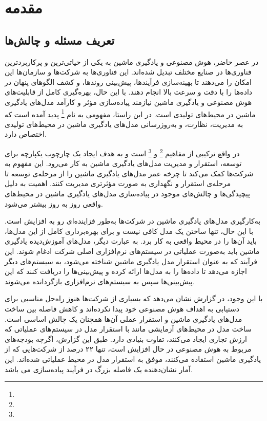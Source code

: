 \chapter{مقدمه} \label{ch:Introduction}

\section{تعریف مسئله و چالش‌ها}
در عصر حاضر، هوش مصنوعی و یادگیری ماشین به یکی از حیاتی‌ترین و پرکاربردترین فناوری‌ها در صنایع مختلف تبدیل شده‌اند. این فناوری‌ها به شرکت‌ها و سازمان‌ها این امکان را می‌دهند تا بهینه‌سازی فرآیندها، پیش‌بینی روندها، و کشف الگوهای پنهان در داده‌ها را با دقت و سرعت بالا انجام دهند. با این حال، بهره‌گیری کامل از قابلیت‌های هوش مصنوعی و یادگیری ماشین نیازمند پیاده‌سازی مؤثر و کارآمد مدل‌های یادگیری ماشین در محیط‌های تولیدی است. در این راستا، مفهومی به نام \footnote{} پدید آمده است که به مدیریت، نظارت، و به‌روزرسانی مدل‌های یادگیری ماشین در محیط‌های تولیدی اختصاص دارد.

در واقع ترکیبی از مفاهیم \footnote{} و \footnote{} است و به هدف ایجاد یک چارچوب یکپارچه برای توسعه، استقرار و مدیریت مدل‌های یادگیری ماشین به کار می‌رود. این مفهوم به شرکت‌ها کمک می‌کند تا چرخه عمر مدل‌های یادگیری ماشین را از مرحله‌ی توسعه تا مرحله‌ی استقرار و نگهداری به صورت مؤثرتری مدیریت کنند. اهمیت  به دلیل پیچیدگی‌ها و چالش‌های موجود در پیاده‌سازی مدل‌های یادگیری ماشین در محیط‌های واقعی روز به روز بیشتر می‌شود.

به‌کارگیری مدل‌های یادگیری ماشین در شرکت‌ها به‌طور فزاینده‌ای رو به افزایش است. با این حال، تنها ساختن یک مدل کافی نیست و برای بهره‌برداری کامل از این مدل‌ها، باید آن‌ها را در محیط واقعی به کار برد. به عبارت دیگر، مدل‌های آموزش‌دیده یادگیری ماشین باید به‌صورت عملیاتی در سیستم‌های نرم‌افزاری اصلی شرکت ادغام شوند. این فرآیند که به عنوان استقرار مدل یادگیری ماشین شناخته می‌شود، به سیستم‌های دیگر اجازه می‌دهد تا داده‌ها را به مدل‌ها ارائه کرده و پیش‌بینی‌ها را دریافت کنند که این پیش‌بینی‌ها سپس به سیستم‌های نرم‌افزاری بازگردانده می‌شوند.

با این وجود،  در گزارش \cite{algorithmiaMLState} نشان می‌دهد که بسیاری از شرکت‌ها هنوز راه‌حل مناسبی برای دستیابی به اهداف هوش مصنوعی خود پیدا نکرده‌اند و کاهش فاصله بین ساخت مدل‌های یادگیری ماشین و استقرار عملی آن‌ها همچنان یک چالش اساسی است. ساخت مدل در محیط‌های آزمایشی مانند  با استقرار مدل در سیستم‌های عملیاتی که ارزش تجاری ایجاد می‌کنند، تفاوت بنیادی دارد. طبق این گزارش، اگرچه بودجه‌های مربوط به هوش مصنوعی در حال افزایش است، تنها ۲۲ درصد از شرکت‌هایی که از یادگیری ماشین استفاده می‌کنند، موفق به استقرار مدل در محیط عملیاتی شده‌اند. این آمار نشان‌دهنده یک فاصله بزرگ در فرآیند پیاده‌سازی می باشد.


